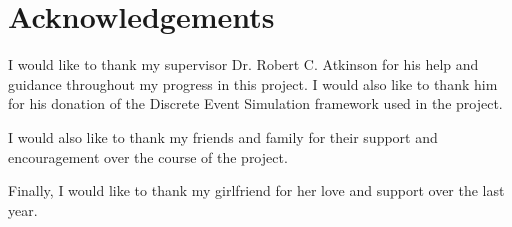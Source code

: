 \chapter*{Acknowledgements}
I would like to thank my supervisor Dr. Robert C. Atkinson for his help and guidance throughout my progress in this project. I would also like to thank him for his donation of the Discrete Event Simulation framework used in the project.

I would also like to thank my friends and family for their support and encouragement over the course of the project.

Finally, I would like to thank my girlfriend for her love and support over the last year.
\pagebreak

